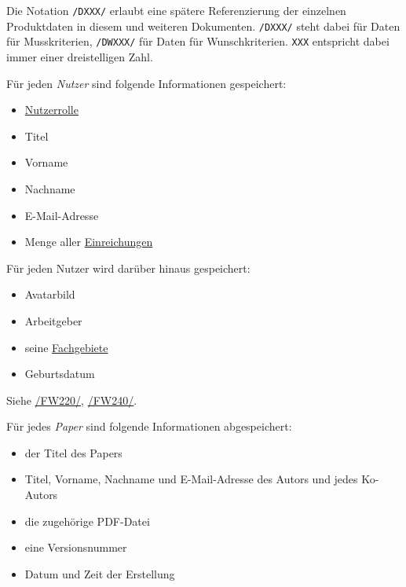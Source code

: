 
Die Notation \texttt{/DXXX/} erlaubt eine spätere Referenzierung der einzelnen Produktdaten in diesem und weiteren
Dokumenten. \texttt{/DXXX/} steht dabei für Daten für Musskriterien, \texttt{/DWXXX/} für Daten für Wunschkriterien. \texttt{XXX} entspricht dabei immer einer dreistelligen Zahl.

\begin{description}

	 Für jeden \emph{Nutzer} sind folgende Informationen gespeichert:
	\begin{itemize}
		\item \hyperref[produktfunktionen]{Nutzerrolle}
		\item Titel
		\item Vorname
		\item Nachname
		\item E-Mail-Adresse
		\item Menge aller \hyperref[d025]{Einreichungen}
	\end{itemize}

	 Für jeden Nutzer wird darüber hinaus gespeichert:
	\begin{itemize}
		\item Avatarbild
		\item Arbeitgeber
		\item seine \hyperref[d035]{Fachgebiete}
		\item Geburtsdatum
	\end{itemize}
	Siehe \hyperref[funkt:220]{/FW220/}, \hyperref[funkt:240]{/FW240/}.

	 Für jedes \emph{Paper} sind folgende Informationen abgespeichert:
	\begin{itemize}
		\item der Titel des Papers
		\item Titel, Vorname, Nachname und E-Mail-Adresse des Autors und jedes Ko-Autors
		\item die zugehörige PDF-Datei
		\item eine Versionsnummer
		\item Datum und Zeit der Erstellung
	\end{itemize}


\end{description}
